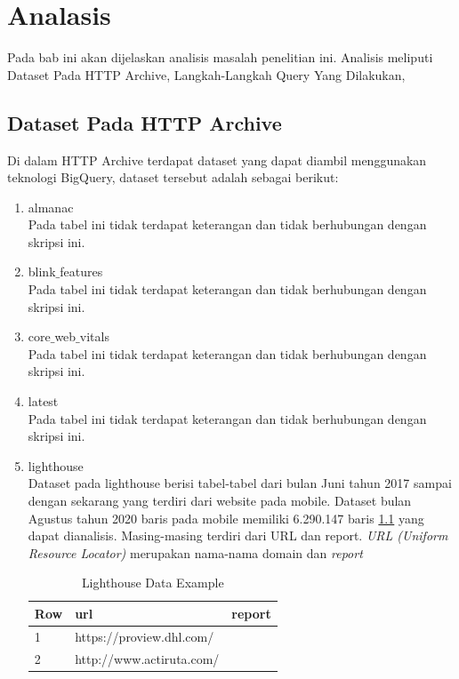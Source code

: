 \chapter{Analasis}
\label{chap:analisis}
Pada bab ini akan dijelaskan analisis masalah penelitian ini. Analisis meliputi Dataset Pada HTTP Archive, Langkah-Langkah Query Yang Dilakukan, 
\section{Dataset Pada HTTP Archive}
Di dalam HTTP Archive terdapat dataset yang dapat diambil menggunakan teknologi BigQuery, dataset tersebut adalah sebagai berikut:
\begin{enumerate}
	\item almanac\\
	Pada tabel ini tidak terdapat keterangan dan tidak berhubungan dengan skripsi ini.
	\item blink$\_$features\\
	Pada tabel ini tidak terdapat keterangan dan tidak berhubungan dengan skripsi ini.
	\item core$\_$web$\_$vitals\\
	Pada tabel ini tidak terdapat keterangan dan tidak berhubungan dengan skripsi ini.
	\item latest\\
	Pada tabel ini tidak terdapat keterangan dan tidak berhubungan dengan skripsi ini.
	\item lighthouse\\
	Dataset pada lighthouse berisi tabel-tabel dari bulan Juni tahun 2017 sampai dengan sekarang yang terdiri dari website pada mobile. Dataset bulan Agustus tahun 2020 baris pada mobile memiliki 6.290.147 baris \ref{table:ct_lh_mobile} yang dapat dianalisis. Masing-masing terdiri dari URL dan report. \textit{URL (Uniform Resource Locator)} merupakan nama-nama domain dan \textit{report}
	\begin{table}[h!]
		\centering
		\begin{tabular}{|l|l|p{7cm}|}
			\hline
			\textbf{Row} & \textbf{url} & \textbf{report}\\
			\hline
			1 & https://proview.dhl.com/ & \\
			\hline
			2 & http://www.actiruta.com/ & \\
			\hline
		\end{tabular}
		\caption{Lighthouse Data Example}
		\label{table:ct_lh_mobile}
	\end{table}
	

\end{enumerate}
